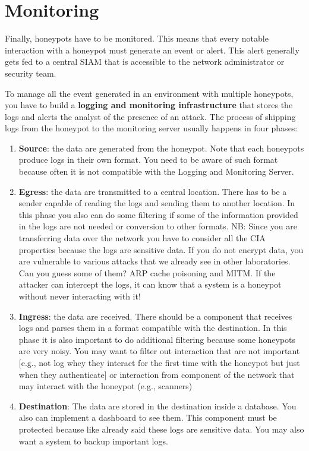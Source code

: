 \documentclass[epsfig,a4paper,11pt,titlepage,oneside,openany]{book}
\begin{document}
\section{Monitoring}

Finally, honeypots have to be monitored. This means that every notable interaction with a honeypot must generate an event or alert. This alert generally gets fed to a central SIAM that is accessible to the network administrator or security team.

To manage all the event generated in an environment with multiple honeypots, you have to build a \textbf{logging and monitoring infrastructure} that stores the logs and alerts the analyst of the presence of an attack. The process of shipping logs from the honeypot to the monitoring server usually happens in four phases:
\begin{enumerate}
\item \textbf{Source}: the data are generated from the honeypot. Note that each honeypots produce logs in their own format. You need to be aware of such format because often it is not compatible with the Logging and Monitoring Server.
\item \textbf{Egress}: the data are transmitted to a central location. There has to be a sender capable of reading the logs and sending them to another location. In this phase you also can do some filtering  if some of the information provided in the logs are not needed or conversion to other formats. 
NB: Since you are transferring data over the network you have to consider all the CIA properties because the logs are sensitive data. If you do not encrypt data, you are vulnerable to various attacks that we already see in other laboratories. Can you guess some of them? ARP cache poisoning and MITM. If the attacker can intercept the logs, it can know that a system is a honeypot without never interacting with it!

\item	\textbf{Ingress}: the data are received. There should be a component that receives logs and parses them in a format compatible with the destination. In this phase it is also important to do additional filtering because  some honeypots are very noisy. You may want to filter out interaction that are not important [e.g., not log whey they interact for the first time with the honeypot but just when they authenticate] or interaction from component of the network that may interact with the honeypot (e.g., scanners)
\item \textbf{Destination}: The data are stored in the destination inside a database.  You also can implement a dashboard to see them. This component must be protected because like already said these logs are sensitive data. You may also want a system to backup important logs.
\end{enumerate}
\end{document}
